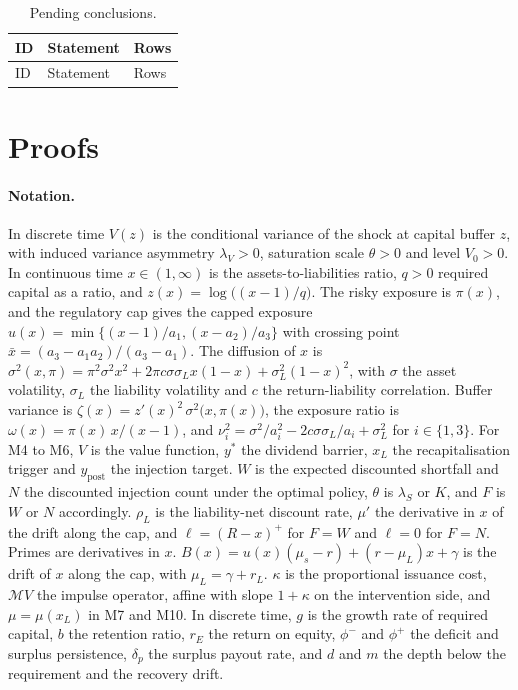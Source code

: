 \begin{longtable}{@{}P{0.8cm}P{12.3cm}P{3.4cm}@{}}
\caption{Pending conclusions.}\label{tab:pending}\\
\toprule
ID & Statement & Rows \\
\midrule
\endfirsthead
\toprule
ID & Statement & Rows \\
\midrule
\endhead


\bottomrule
\end{longtable}
\normalsize




\appendix

\section{Proofs}
\label{app:proofs}

\paragraph{Notation.} In discrete time $V(z)$ is the conditional variance of
the shock at capital buffer $z$, with induced variance asymmetry
$\lambda_V>0$, saturation scale $\theta>0$ and level $V_0>0$. In continuous
time $x\in(1,\infty)$ is the assets-to-liabilities ratio, $q>0$ required
capital as a ratio, and $z(x)=\log\big((x-1)/q\big)$. The risky exposure is $\pi(x)$,
and the regulatory cap gives the capped exposure
$u(x)=\min\{(x-1)/a_1,(x-a_2)/a_3\}$ with crossing point
$\bar x=(a_3-a_1a_2)/(a_3-a_1)$. The diffusion of $x$ is
$\sigma^2(x,\pi)=\pi^2\sigma^2x^2+2\pi c\sigma\sigma_Lx(1-x)+\sigma_L^2(1-x)^2$,
with $\sigma$ the asset volatility, $\sigma_L$ the liability volatility and $c$ the
return-liability correlation.
Buffer variance is $\zeta(x)=z'(x)^2\,\sigma^2\big(x,\pi(x)\big)$, the
exposure ratio is $\omega(x)=\pi(x)\,x/(x-1)$, and $\nu_i^2=\sigma^2/a_i^2-2c\sigma\sigma_L/a_i+\sigma_L^2$ for $i\in\{1,3\}$.
For M4 to M6, $V$ is the value function, $y^*$ the dividend barrier, $x_L$
the recapitalisation trigger and $y_{\text{post}}$ the injection target. $W$
is the expected discounted shortfall and $N$ the discounted injection count
under the optimal policy, $\theta$ is $\lambda_S$ or $K$, and $F$ is $W$ or $N$
accordingly. $\rho_L$ is the liability-net discount rate, $\mu'$ the
derivative in $x$ of the drift along the cap, and $\ell=(R-x)^+$ for $F=W$ and
$\ell=0$ for $F=N$. Primes are derivatives in $x$. $B(x)=u(x)(\mu_s-r)+(r-\mu_L)x+\gamma$
is the drift of $x$ along the cap, with $\mu_L=\gamma+r_L$. $\kappa$ is the
proportional issuance cost, $\mathcal MV$ the impulse operator, affine with
slope $1+\kappa$ on the intervention side, and $\mu=\mu(x_L)$ in M7 and M10. In discrete
time, $g$ is the growth rate of required capital, $b$ the retention ratio,
$r_E$ the return on equity, $\phi^-$ and $\phi^+$ the deficit and surplus
persistence, $\delta_p$ the surplus payout rate, and $d$ and $m$ the depth
below the requirement and the recovery drift.

